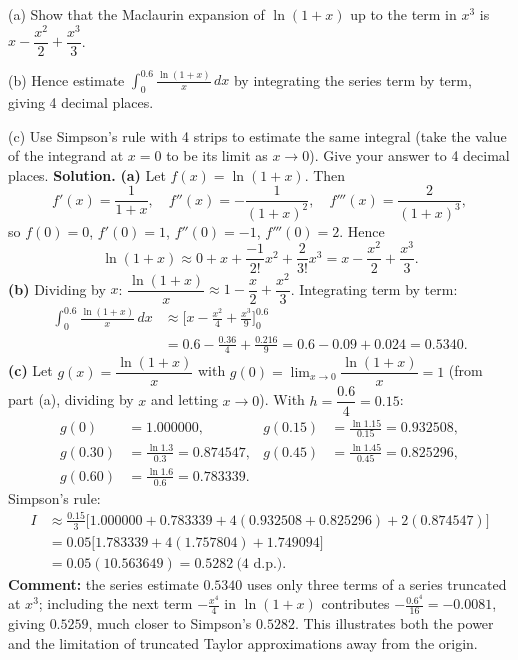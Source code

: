 \documentclass[11pt]{article}
\begin{document}
\begin{exoresolu}
(a) Show that the Maclaurin expansion of $\ln(1+x)$ up to the term in $x^3$ is $x-\dfrac{x^2}{2}+\dfrac{x^3}{3}$.\par
(b) Hence estimate $\displaystyle\int_0^{0.6}\frac{\ln(1+x)}{x}\,dx$ by integrating the series term by term, giving 4 decimal places.\par
(c) Use Simpson's rule with 4 strips to estimate the same integral (take the value of the integrand at $x=0$ to be its limit as $x\to0$). Give your answer to 4 decimal places.
\tcblower
\textbf{Solution.} \textbf{(a)} Let $f(x)=\ln(1+x)$. Then
\[ f'(x)=\frac{1}{1+x},\quad f''(x)=-\frac{1}{(1+x)^2},\quad f'''(x)=\frac{2}{(1+x)^3}, \]
so $f(0)=0$, $f'(0)=1$, $f''(0)=-1$, $f'''(0)=2$. Hence
\[ \ln(1+x)\approx 0+x+\frac{-1}{2!}x^2+\frac{2}{3!}x^3=x-\frac{x^2}{2}+\frac{x^3}{3}. \]
\textbf{(b)} Dividing by $x$: $\dfrac{\ln(1+x)}{x}\approx 1-\dfrac{x}{2}+\dfrac{x^2}{3}$. Integrating term by term:
\begin{align*}
\int_0^{0.6}\frac{\ln(1+x)}{x}\,dx&\approx\Big[x-\frac{x^2}{4}+\frac{x^3}{9}\Big]_0^{0.6}\\
&=0.6-\frac{0.36}{4}+\frac{0.216}{9}=0.6-0.09+0.024=0.5340.
\end{align*}
\textbf{(c)} Let $g(x)=\dfrac{\ln(1+x)}{x}$ with $g(0)=\lim_{x\to0}\dfrac{\ln(1+x)}{x}=1$ (from part (a), dividing by $x$ and letting $x\to0$). With $h=\dfrac{0.6}{4}=0.15$:
\begin{align*}
g(0)&=1.000000, & g(0.15)&=\tfrac{\ln1.15}{0.15}=0.932508,\\
g(0.30)&=\tfrac{\ln1.3}{0.3}=0.874547, & g(0.45)&=\tfrac{\ln1.45}{0.45}=0.825296,\\
g(0.60)&=\tfrac{\ln1.6}{0.6}=0.783339. &&
\end{align*}
Simpson's rule:
\begin{align*}
I&\approx\frac{0.15}{3}\Big[1.000000+0.783339+4(0.932508+0.825296)+2(0.874547)\Big]\\
&=0.05\big[1.783339+4(1.757804)+1.749094\big]\\
&=0.05(10.563649)=0.5282\ \text{(4 d.p.)}.
\end{align*}
\textbf{Comment:} the series estimate $0.5340$ uses only three terms of a series truncated at $x^3$; including the next term $-\frac{x^4}{4}$ in $\ln(1+x)$ contributes $-\frac{0.6^4}{16}=-0.0081$, giving $0.5259$, much closer to Simpson's $0.5282$. This illustrates both the power and the limitation of truncated Taylor approximations away from the origin.
\end{exoresolu}
\end{document}
